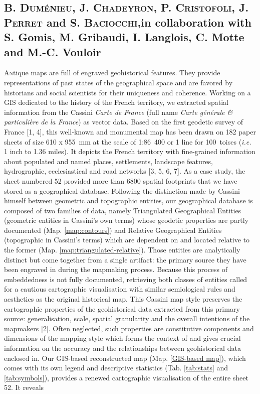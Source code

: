 \documentclass[portrait,a0]{sciposter}
\begin{document}
\vspace{1cm}
\begin{minipage}[b]{\textwidth}
  \setlength{\parindent}{-0em}
  \begin{multicols}{3}
    \section*{\normalfont B. \textsc{Duménieu}, J. \textsc{Chadeyron}, P. \textsc{Cristofoli}, J. \textsc{Perret} and S. \textsc{Baciocchi},\newline in collaboration with S. Gomis, M. Gribaudi, I. Langlois, C. Motte and M.-C. Vouloir}
    \lettrine{A}ntique maps are full of engraved geohistorical features. They provide representations of past states of the  geographical space and are favored by historians and social scientists for their uniqueness and coherence. Working on a GIS dedicated to the history of the French territory, we extracted spatial information from the Cassini \textit{Carte de France} (full name \textit{Carte générale \textsc{\textit{\&}} particulière de la France}) as vector data. Based on the first geodetic survey of France [1, 4], this well-known and monumental map has been drawn on 182 paper sheets of size 610 x 955~mm at the scale of 1:86~400 or 1 line for 100~toises (\textit{i.e.} 1 inch to 1.36 miles). It depicts the French territory with fine-grained information about populated and named places, settlements, landscape features, hydrographic, ecclesiastical and road networks [3, 5, 6, 7]. As a case study, the sheet numbered 52 provided more than \num{6800} spatial footprints that we have stored as a geographical database. Following the distinction made by Cassini himself between \og geometric \fg and \og topographic \fg entities, our geographical database is composed of two families of data, namely Triangulated Geographical Entities (\og geometric \fg entities in Cassini’s own terms) whose geodetic properties are partly documented (Map. \ref{map:contours}) and Relative Geographical Entities (\og topographic \fg in Cassini’s terms) which are dependent on and located relative to the former (Map. \ref{map:triangulated-relative}). Those entities are analytically distinct but come together from a single artifact: the primary source they have been engraved in during the mapmaking process. Because this process of embeddedness is not fully documented, retrieving both classes of entities called for a cautious cartographic visualisation with similar semiological rules and aesthetics as the original historical map. This \og Cassini map style \fg preserves the cartographic properties of the geohistorical data extracted from this primary source: generalisation, scale, spatial granularity and the overall intentions of the mapmakers [2]. Often neglected, such properties are constitutive components and dimensions of the mapping style which forms the context of and gives crucial information on the accuracy and the relationships between geohistorical data enclosed in. Our GIS-based reconstructed map (Map. \ref{GIS-based map}),  which comes with its own legend and descriptive statistics (Tab. \ref{tab:stats} and \ref{tab:symbols}), provides a renewed cartographic visualisation of the entire sheet 52. It reveals 
\end{multicols}
\end{minipage}
\end{document}
